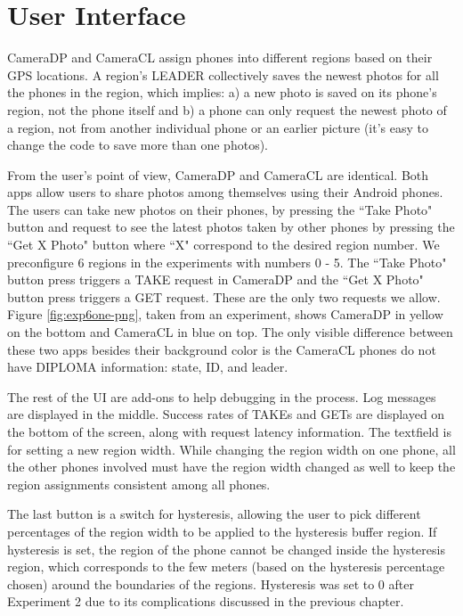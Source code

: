 \chapter{User Interface}

CameraDP and CameraCL assign phones into different regions based on their GPS locations. A region's LEADER collectively saves the newest photos for all the phones in the region, which implies: a) a new photo is saved on its phone's region, not the phone itself and b) a phone can only request the newest photo of a region, not from another individual phone or an earlier picture (it's easy to change the code to save more than one photos). 

From the user's point of view, CameraDP and CameraCL are identical. Both apps allow users to share photos among themselves using their Android phones.  The users can take new photos on their phones, by pressing the \textquotedblleft Take Photo" button and request to see the latest photos taken by other phones by pressing the \textquotedblleft Get X Photo" button where \textquotedblleft X" correspond to the desired region number. We preconfigure 6 regions in the experiments with numbers 0 - 5. The \textquotedblleft Take Photo" button press triggers a TAKE request in CameraDP and the \textquotedblleft Get X Photo" button press triggers a GET request. These are the only two requests we allow.  Figure \ref{fig:exp6one-png}, taken from an experiment, shows CameraDP in yellow on the bottom and CameraCL in blue on top. The only visible difference between these two apps besides their background color is the CameraCL phones do not have DIPLOMA information: state, ID, and leader.

The rest of the UI are add-ons to help debugging in the process. Log messages are displayed in the middle. Success rates of TAKEs and GETs are displayed on the bottom of the screen, along with request latency information. The textfield is for setting a new region width. While changing the region width on one phone, all the other phones involved must have the region width changed as well to keep the region assignments consistent among all phones. 

The last button is a switch for hysteresis, allowing the user to pick different percentages of the region width to be applied to the hysteresis buffer region. If hysteresis is set, the region of the phone cannot be changed inside the hysteresis region, which corresponds to the few meters (based on the hysteresis percentage chosen) around the boundaries of the regions. Hysteresis was set to 0 after Experiment 2 due to its complications discussed in the previous chapter.


